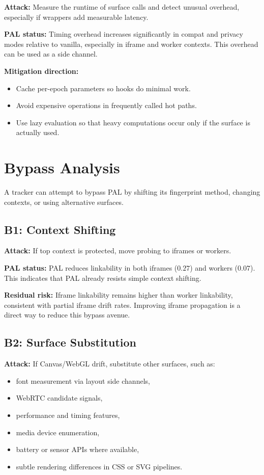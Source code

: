 \documentclass[11pt]{report}
\begin{document}
\textbf{Attack:} Measure the runtime of surface calls and detect unusual overhead, especially if wrappers add measurable latency.

\textbf{PAL status:} Timing overhead increases significantly in compat and privacy modes relative to vanilla, especially in iframe and worker contexts. This overhead can be used as a side channel.

\textbf{Mitigation direction:}
\begin{itemize}
    \item Cache per-epoch parameters so hooks do minimal work.
    \item Avoid expensive operations in frequently called hot paths.
    \item Use lazy evaluation so that heavy computations occur only if the surface is actually used.
\end{itemize}

\section{Bypass Analysis}

A tracker can attempt to bypass PAL by shifting its fingerprint method, changing contexts, or using alternative surfaces.

\subsection{B1: Context Shifting}

\textbf{Attack:} If top context is protected, move probing to iframes or workers.

\textbf{PAL status:} PAL reduces linkability in both iframes ($0.27$) and workers ($0.07$). This indicates that PAL already resists simple context shifting.

\textbf{Residual risk:} Iframe linkability remains higher than worker linkability, consistent with partial iframe drift rates. Improving iframe propagation is a direct way to reduce this bypass avenue.

\subsection{B2: Surface Substitution}

\textbf{Attack:} If Canvas/WebGL drift, substitute other surfaces, such as:

\begin{itemize}
    \item font measurement via layout side channels,
    \item WebRTC candidate signals,
    \item performance and timing features,
    \item media device enumeration,
    \item battery or sensor APIs where available,
    \item subtle rendering differences in CSS or SVG pipelines.
\end{itemize}
\end{document}
